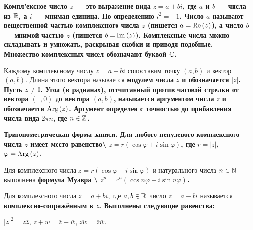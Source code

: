 \begin{solution}
\bf{Компл'ексное число} \(z\) --- это выражение вида \(z=a+bi\), где \(a\) и \(b\) --- числа из \(\mathbb{R}\), а \(i\) --- \bf{мнимая единица}. По определению \(i^2=-1\).
Число \(a\) называют \bf{вещественной частью} комплексного числа \(z\) (пишется \(a={\rm Re}\,(z)\)), а число \(b\) --- \bf{мнимой частью} \(z\) (пишется \(b={\rm Im}\,(z)\)).
Комплексные числа можно складывать и умножать, \lgq раскрывая скобки и приводя подобные\rgq. Множество комплексных чисел обозначают буквой \(\mathbb{C}\).

Каждому комплексному числу \(z=a+bi\) сопоставим точку \((a,b)\) и вектор \((a,b)\). Длина этого вектора называется \bf{модулем} числа \(z\) и обозначается \(|z|\). Пусть \(z\ne0\).
Угол (в радианах), отсчитанный против часовой стрелки от вектора \((1,0)\) до вектора \((a,b)\), называется \bf{аргументом} числа \(z\) и обозначается \({\rm Arg}\,(z)\). Аргумент определен с точностью до прибавления числа вида \(2\pi n\), где \(n\in\mathbb{Z}\).

\bf{Тригонометрическая форма записи.} Для любого ненулевого комплексного числа \(z\) имеет место равенство\textbackslash{} \(z=r (\cos \varphi +i\sin \varphi )\), где \(r=|z|\), \(\varphi={\rm Arg}\,(z)\).

Для комплексного числа \(z=r(\cos\varphi+i\sin\varphi)\) и натурального числа \(n\in\mathbb{N}\) выполнена \bf{формула Муавра} \textbackslash{}
\(z^n=r^n(\cos n\varphi+i\sin n\varphi)\).

Для комплексного числа \(z=a+bi\), где \(a,b\in \mathbb{R}\) число \(\overline{z}=a-bi\) называется \bf{комплексно-сопряжённым} к \(z\). Выполнены следующие равенства:

\(|z|^2=z\overline{z}\), \(\overline{z+w} = \overline{z} + \overline{w}\), \(\overline{zw}= \overline{z}\overline{w}\).

\end{solution}

\begin{problem}[10(2.2)]
\end{problem}

